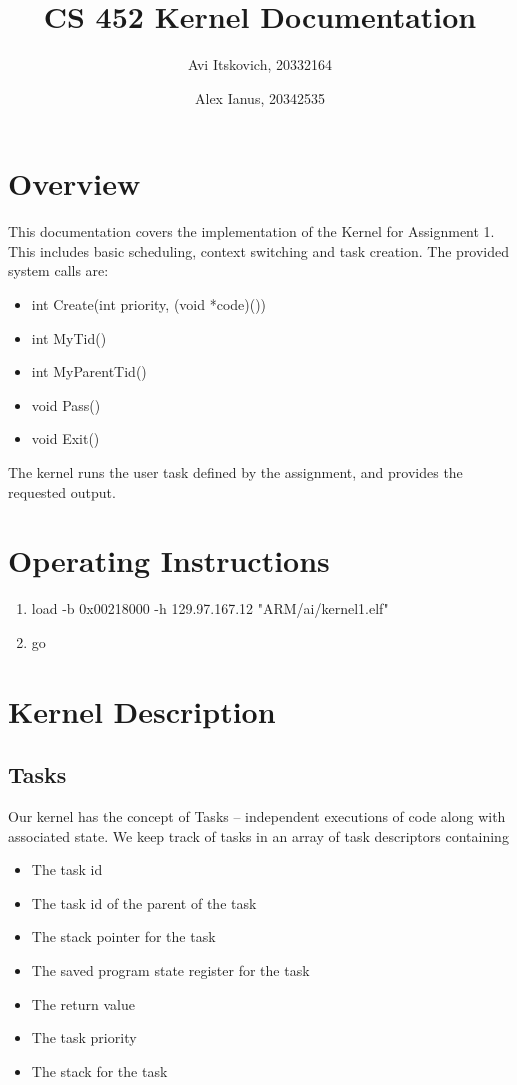 \documentclass{article}
\title{CS 452 Kernel Documentation}
\author{
  Avi Itskovich, 20332164
  \and
  Alex Ianus, 20342535
}
\begin{document}
\maketitle

\section{Overview}

This documentation covers the implementation of the Kernel for Assignment 1. This includes basic scheduling, context switching and task creation. The provided system calls are:
\begin{itemize}
  \item int Create(int priority, (void *code)())
  \item int MyTid()
  \item int MyParentTid()
  \item void Pass()
  \item void Exit()
\end{itemize}
The kernel runs the user task defined by the assignment, and provides the requested output.

\section{Operating Instructions}
\begin{enumerate}
  \item load -b 0x00218000 -h 129.97.167.12 "ARM/ai/kernel1.elf"
  \item go
\end{enumerate}

\section{Kernel Description}

\subsection{Tasks}

Our kernel has the concept of Tasks -- independent executions of code along with associated state. We keep track of tasks in an array of task descriptors containing

\begin{itemize}
  \item The task id
  \item The task id of the parent of the task
  \item The stack pointer for the task
  \item The saved program state register for the task
  \item The return value
  \item The task priority
  \item The stack for the task
\end{itemize}
\end{document}

